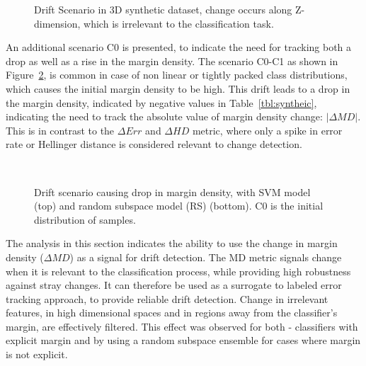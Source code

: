 \documentclass[authoryear,3p,times,twocolumn]{elsarticle}
\begin{document}
\begin{figure}[t]
\centering
{}
\caption{Drift Scenario in 3D synthetic dataset, change occurs along Z- dimension, which is irrelevant to the classification task. }
\label{fig:scenarios2}
\end{figure}

An additional scenario C0 is presented, to indicate the need for tracking both a drop as well as a rise in the margin density. The scenario C0-C1 as shown in Figure~\ref{fig:scenarios3}, is common in case of non linear or tightly packed class distributions, which causes the initial margin density to be high. This drift leads to a drop in the margin density, indicated by negative values in Table~\ref{tbl:syntheic}, indicating the need to track the absolute value of margin density change: $|\Delta MD|$. This is in contrast to the $\Delta Err$ and $\Delta HD$ metric, where only a spike in error rate or Hellinger distance is considered relevant to change detection. 

\begin{figure}[t]
\centering
{} \quad
{}
\\
 \quad
{}
\caption{Drift scenario causing drop in margin density, with SVM model (top) and random subspace model (RS) (bottom). C0 is the initial distribution of samples. }
\label{fig:scenarios3}
\end{figure}

The analysis in this section indicates the ability to use the change in margin density ($\Delta MD$) as a signal for drift detection. The MD metric signals change when it is relevant to the classification process, while providing high robustness against stray changes. It can therefore be used as a surrogate to labeled error tracking approach, to provide reliable drift detection. Change in irrelevant features, in high dimensional spaces and in regions away from the classifier's margin, are effectively filtered. This effect was observed for both - classifiers with explicit margin and by using a random subspace ensemble for cases where margin is not explicit.
\end{document}
